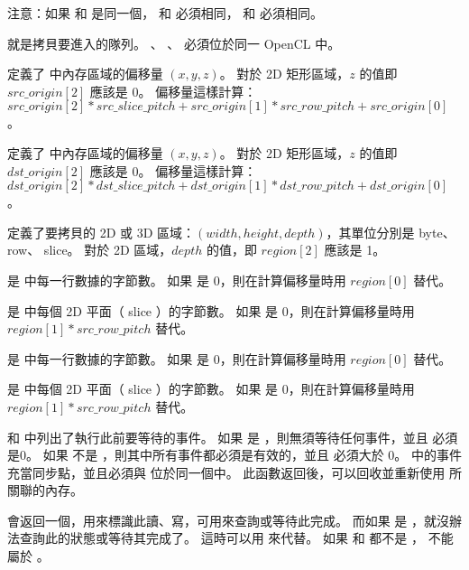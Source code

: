注意：如果  和  是同一個，
  和  必須相同，
  和  必須相同。

 就是拷貝要進入的隊列。
、 、  必須位於同一 OpenCL 中。

 定義了  中內存區域的偏移量 $(x,y,z)$。
對於 2D 矩形區域，$z$ 的值即 $src\_origin[2]$ 應該是 0。
偏移量這樣計算：
$src\_origin[2] * src\_slice\_pitch + src\_origin[1] * src\_row\_pitch + src\_origin[0]$ 。

 定義了  中內存區域的偏移量 $(x,y,z)$。
對於 2D 矩形區域，$z$ 的值即 $dst\_origin[2]$ 應該是 0。
偏移量這樣計算：
$dst\_origin[2] * dst\_slice\_pitch + dst\_origin[1] * dst\_row\_pitch + dst\_origin[0]$ 。

 定義了要拷貝的 2D 或 3D 區域：$(width,height,depth)$，其單位分別是 byte、 row、 slice。
對於 2D 區域，$depth$ 的值，即 $region[2]$ 應該是 1。

 是  中每一行數據的字節數。
如果  是 0，則在計算偏移量時用 $region[0]$ 替代。

 是  中每個 2D 平面（ slice ）的字節數。
如果  是 0，則在計算偏移量時用 $region[1] * src\_row\_pitch$ 替代。

 是  中每一行數據的字節數。
如果  是 0，則在計算偏移量時用 $region[0]$ 替代。

 是  中每個 2D 平面（ slice ）的字節數。
如果  是 0，則在計算偏移量時用 $region[1] * src\_row\_pitch$ 替代。

 和  中列出了執行此前要等待的事件。
如果  是 ，則無須等待任何事件，並且  必須是0。
如果  不是 ，則其中所有事件都必須是有效的，並且  必須大於 0。
 中的事件充當同步點，並且必須與  位於同一個中。
此函數返回後，可以回收並重新使用  所關聯的內存。

 會返回一個，用來標識此讀、寫，可用來查詢或等待此完成。
而如果  是 ，就沒辦法查詢此的狀態或等待其完成了。
這時可以用  來代替。
如果  和  都不是 ，  不能屬於 。

